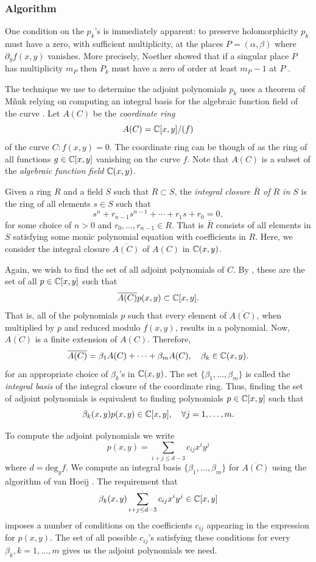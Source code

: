%
\subsubsection*{Algorithm}
%

One condition on the $p_k$'s is immediately apparent: to preserve holomorphicity
$p_k$ must have a zero, with sufficient multiplicity, at the places $P =
(\alpha,\beta)$ where $\partial_y f(x,y)$ vanishes. More precisely, Noether
showed that if a singular place $P$ has multiplicity $m_P$ then $P_k$ must have
a zero of order at least $m_P - 1$ at $P$ \cite{Noether83}.

The technique we use to determine the adjoint polynomials $p_k$ uses a theorem
of M\~{n}uk relying on computing an integral basis for the algebraic function
field of the curve \cite{Mnuk97}. Let $A(C)$ be the {\it coordinate ring}
\[
  A(C) = \operatorname{\mathbb{C}}[x,y] / (f)
\]
of the curve $C : f(x,y) = 0$. The coordinate ring can be though of as the ring
of all functions $g \in \operatorname{\mathbb{C}}[x,y]$ vanishing on the curve $f$. Note that $A(C)$
is a subset of the {\it algebraic function field} $\operatorname{\mathbb{C}}(x,y)$.

Given a ring $R$ and a field $S$ such that $R \subset S$, the {\it integral
  closure $\bar{R}$ of $R$ in $S$} is the ring of all elements $s \in S$ such
that
\[
  s^n + r_{n-1}s^{n-1} + \cdots + r_1 s + r_0 = 0,
\]
for some choice of $n >0$ and $r_0,\ldots,r_{n-1} \in R$. That is $\bar{R}$
consists of all elements in $S$ satisfying some monic polynomial equation with
coefficients in $R$. Here, we consider the integral closure $\overline{A(C)}$ of
$A(C)$ in $\operatorname{\mathbb{C}}(x,y)$.

Again, we wish to find the set of all adjoint polynomials of $C$. By
\cite{Mnuk97}, these are the set of all $p \in \operatorname{\mathbb{C}}[x,y]$ such that
\[
  \overline{A(C)} p(x,y) \subset\operatorname{\mathbb{C}}[x,y].
\]
That is, all of the polynomials $p$ such that every element of
$\overline{A(C)}$, when multiplied by $p$ and reduced modulo $f(x,y)$, results
in a polynomial. Now, $\overline{A(C)}$ is a finite extension of $A(C)$.
Therefore,
\[
  \overline{A(C)} = \beta_1 A(C) + \cdots + \beta_m A(C), \quad \beta_k \in
  \operatorname{\mathbb{C}}(x,y).
\]
for an appropriate choice of $\beta_k$'s in $\operatorname{\mathbb{C}}(x,y)$. The set
$\{\beta_1,\ldots,\beta_m\}$ is called the {\it integral basis} of the integral
closure of the coordinate ring. Thus, finding the set of adjoint polynomials is
equivalent to finding polynomials $p \in \operatorname{\mathbb{C}}[x,y]$ such that
\[
  \beta_k(x,y) p(x,y) \in \operatorname{\mathbb{C}}[x,y], \quad \forall j=1,\ldots,m.
\]

To compute the adjoint polynomials we write
\[
  p(x,y) = \sum_{i+j \leq d-3} c_{ij}x^iy^j
\]
where $d = \text{deg}_y f$. We compute an integral basis
$\{\beta_1,\ldots,\beta_m\}$ for $\overline{A(C)}$ using the algorithm of van
Hoeij \cite{vanHoeij94}. The requirement that
\[
  \beta_k(x,y) \sum_{i+j \leq d-3} c_{ij}x^iy^j \in \operatorname{\mathbb{C}}[x,y]
\]
imposes a number of conditions on the coefficients $c_{ij}$ appearing in the
expression for $p(x,y)$. The set of all possible $c_{ij}$'s satisfying these
conditions for every $\beta_k, k=1,\ldots,m$ gives us the adjoint polynomials we
need.

